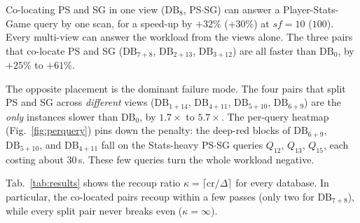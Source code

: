 \documentclass[sigconf]{acmart}
\begin{document}
Co-locating PS and SG in one view ($\mathrm{DB}_8$, PS$\cdot$SG) can answer a \textsf{Player}-\textsf{Stats}-\textsf{Game} query by one scan, for a speed-up by $+32\%$ ($+30\%$) at $\textit{sf}=10$ ($100$). Every multi-view can answer the workload from the views alone. The three pairs that co-locate PS and SG ($\mathrm{DB}_{7+8}$, $\mathrm{DB}_{2+13}$, $\mathrm{DB}_{3+12}$) are all faster than $\mathrm{DB}_0$, by $+25\%$ to $+61\%$. %

The opposite placement is the dominant failure mode. The four pairs that split PS and SG across \emph{different} views ($\mathrm{DB}_{1+14}$, $\mathrm{DB}_{4+11}$, $\mathrm{DB}_{5+10}$, $\mathrm{DB}_{6+9}$) are the \emph{only} instances slower than $\mathrm{DB}_0$, by $1.7\times$ to $5.7\times$. %
The per-query heatmap (Fig.~\ref{fig:perquery}) pins down the penalty: the deep-red blocks of $\mathrm{DB}_{6+9}$, $\mathrm{DB}_{5+10}$, and $\mathrm{DB}_{4+11}$ fall on the \textsf{Stats}-heavy PS$\cdot$SG queries $Q_{12}$, $Q_{13}$, $Q_{15}$, each costing about $30$\,s. These few queries turn the whole workload negative. %


Tab.~\ref{tab:results} shows the recoup ratio $\kappa=\lceil\mathrm{cr}/\Delta\rceil$ for every database. In particular, the co-located pairs recoup within a few passes (only two for $\mathrm{DB}_{7+8}$), while every split pair never breaks even ($\kappa=\infty$).
\end{document}
